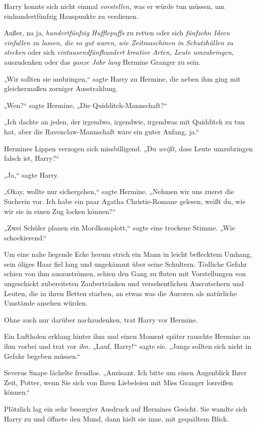 {Harry konnte sich nicht einmal \emph{vorstellen,} was er würde tun müssen, um einhundertfünfzig Hauspunkte zu verdienen.

Außer, na ja, \emph{hundertfünfzig Hufflepuffs} zu retten oder sich \emph{fünfzehn Ideen einfallen zu lassen, die so gut waren, wie Zeitmaschinen in Schutzhüllen zu stecken} oder sich \emph{eintausendfünfhundert kreative Arten, Leute umzubringen}, auszudenken oder das \emph{ganze Jahr lang} Hermine Granger zu sein.

„Wir sollten sie umbringen,“ sagte Harry zu Hermine, die neben ihm ging mit gleichermaßen zorniger Ausstrahlung.

„Wen?“ sagte Hermine, „Die Quidditch-Mannschaft?“

„Ich dachte an jeden, der irgendwo, irgendwie, irgendwas mit Quidditch zu tun hat, aber die Ravenclaw-Mannschaft wäre ein guter Anfang, ja.“

Hermines Lippen verzogen sich missbilligend. „Du \emph{weißt,} dass Leute umzubringen falsch ist, Harry?“

„Ja,“ sagte Harry.

„Okay, wollte nur sichergehen,“ sagte Hermine. „Nehmen wir uns zuerst die Sucherin vor. Ich habe ein paar Agatha Christie-Romane gelesen, weißt du, wie wir sie in einen Zug locken können?“

„Zwei Schüler planen ein Mordkomplott,“ sagte eine trockene Stimme. „Wie schockierend.“

Um eine nahe liegende Ecke herum strich ein Mann in leicht beflecktem Umhang, sein öliges Haar fiel lang und ungekämmt über seine Schultern. Tödliche Gefahr schien von ihm auszuströmen, schien den Gang zu fluten mit Vorstellungen von ungeschickt zubereiteten Zaubertränken und versehentlichen Ausrutschern und Leuten, die in ihren Betten starben, an etwas was die Auroren als natürliche Umstände ansehen würden.

Ohne auch nur darüber nachzudenken, trat Harry vor Hermine.

Ein Luftholen erklang hinter ihm und einen Moment später rauschte Hermine an ihm vorbei und trat vor \emph{ihn.} „Lauf, Harry!“ sagte sie. „Jungs sollten sich nicht in Gefahr begeben müssen.“

Severus Snape lächelte freudlos. „Amüsant. Ich bitte um einen Augenblick Ihrer Zeit, Potter, wenn Sie sich von Ihren Liebeleien mit Miss Granger losreißen können.“

Plötzlich lag ein sehr besorgter Ausdruck auf Hermines Gesicht. Sie wandte sich Harry zu und öffnete den Mund, dann hielt sie inne, mit gequältem Blick.

}
